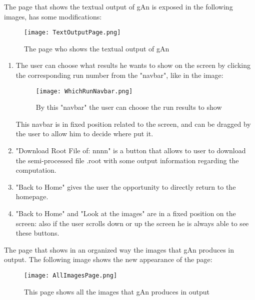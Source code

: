 The page that shows the textual output of gAn is exposed in the following images, has some modifications:

\begin{figure}[H]
\centering
\texttt{[image: TextOutputPage.png]} 
\caption{The page who shows the textual output of gAn}
\end{figure}


\begin{enumerate}
\item The user can choose what results he wants to show on the screen by clicking the corresponding run number from the "navbar", like in the image:

\begin{figure}[H]
\centering
\texttt{[image: WhichRunNavbar.png]} 
\caption{By this "navbar" the user can choose the run results to show}
\end{figure}

This navbar is in fixed position related to the screen, and can be dragged by the user to allow him to decide where put it.

\item "Download Root File of: nnnn" is a button that allows to user to download the semi-processed file .root with some output information regarding the computation.

\item "Back to Home" gives the user the opportunity to directly return to the homepage. 

\item "Back to Home" and "Look at the images" are in a fixed position on the screen: also if the user scrolls down or up the screen he is always able to see these buttons.    

\end{enumerate}
The page that shows in an organized way the images that gAn produces in output. The following image shows the new appearance of the page:



\begin{figure}[H]
\centering
\texttt{[image: AllImagesPage.png]} 
\caption{This page shows all the images that gAn produces in output}
\end{figure}


